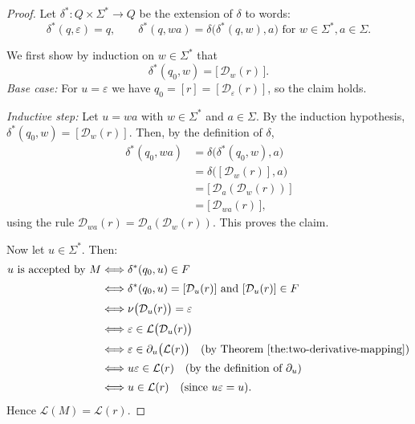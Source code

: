 \documentclass{article}
\begin{document}
\begin{proof}
Let $\delta^* : Q \times \Sigma^* \to Q$ be the extension of
$\delta$ to words:
\[
  \delta^*(q,\varepsilon) = q,
  \qquad
  \delta^*(q,wa) = \delta\bigl(\delta^*(q,w),a\bigr)
  \text{ for } w \in \Sigma^*, a \in \Sigma.
\]

We first show by induction on $w \in \Sigma^*$ that
\[
  \delta^*(q_0,w) = \bigl[\,\mathcal{D}_w(r)\,\bigr].
\]
\emph{Base case:} For $u = \varepsilon$ we have
$q_0 = [r] = [\mathcal{D}_\varepsilon(r)]$, so the claim holds.

\emph{Inductive step:} Let $u = wa$ with $w \in \Sigma^*$ and $a \in \Sigma$.
By the induction hypothesis,
$\delta^*(q_0,w) = [\mathcal{D}_w(r)]$.
Then, by the definition of $\delta$,
\[
  \begin{aligned}
    \delta^*(q_0,wa)
  &= \delta\bigl(\delta^*(q_0,w),a\bigr) \\
  &= \delta\bigl([\mathcal{D}_w(r)],a\bigr) \\
  &= \bigl[\,\mathcal{D}_a(\mathcal{D}_w(r))\,\bigr] \\
  &= \bigl[\,\mathcal{D}_{wa}(r)\,\bigr],
  \end{aligned}
\]
using the rule $\mathcal{D}_{wa}(r) = \mathcal{D}_a(\mathcal{D}_w(r))$.
This proves the claim.

Now let $u \in \Sigma^*$. Then:
\[
\begin{aligned}
u \text{ is accepted by } M
&\Longleftrightarrow \delta^*(q_0,u) \in F \\[0.5ex]
&\Longleftrightarrow \delta^*(q_0,u) = [\mathcal{D}_u(r)]
             \text{ and } [\mathcal{D}_u(r)] \in F
             \quad\\[0.5ex]
&\Longleftrightarrow \nu\bigl(\mathcal{D}_u(r)\bigr) = \varepsilon \\[0.5ex]
&\Longleftrightarrow \varepsilon \in \mathcal{L}\bigl(\mathcal{D}_u(r)\bigr) \\[0.5ex]
&\Longleftrightarrow \varepsilon \in \partial_u\bigl(\mathcal{L}(r)\bigr)
     \quad\text{(by Theorem~\ref{the:two-derivative-mapping})} \\[0.5ex]
&\Longleftrightarrow u\varepsilon \in \mathcal{L}(r)
     \quad\text{(by the definition of }\partial_u\text{)} \\[0.5ex]
&\Longleftrightarrow u \in \mathcal{L}(r)
     \quad\text{(since }u\varepsilon = u\text{).}
\end{aligned}
\]
Hence $\mathcal{L}(M) = \mathcal{L}(r)$.

\end{proof}
\end{document}
